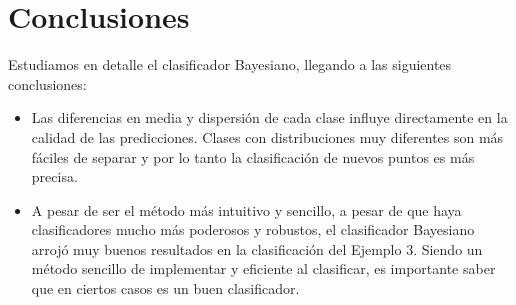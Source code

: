 \documentclass[a4paper,11pt]{article}
\begin{document}
\section{Conclusiones}
Estudiamos en detalle el clasificador Bayesiano, llegando a las siguientes conclusiones:
\begin{itemize}
\item Las diferencias en media y dispersión de cada clase influye directamente en la calidad de las predicciones. Clases con distribuciones muy diferentes son más fáciles de separar y por lo tanto la clasificación de nuevos puntos es más precisa.
\item A pesar de ser el método más intuitivo y sencillo, a pesar de que haya clasificadores mucho más poderosos y robustos, el clasificador Bayesiano arrojó muy buenos resultados en la clasificación del Ejemplo 3. Siendo un método sencillo de implementar y eficiente al clasificar, es importante saber que en ciertos casos es un buen clasificador.
\end{itemize}
\end{document}
